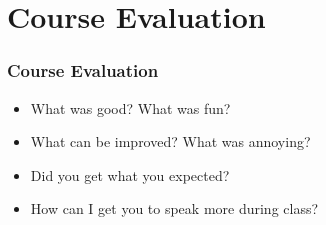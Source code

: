 \documentclass[10pt]{beamer}
\begin{document}

\section{Course Evaluation}
\frame{\sectionpage}

\begin{frame}

\frametitle{Course Evaluation}

\begin{itemize}
\item What was good? What was fun?
\item What can be improved? What was annoying?
\item Did you get what you expected?
\item How can I get you to speak more during class?
\end{itemize}

\end{frame}


\end{document}

